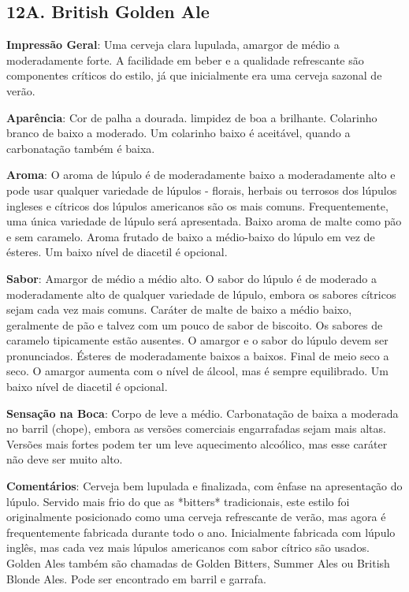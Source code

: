 \subsection*{12A. British Golden Ale}

\textbf{Impressão Geral}: Uma cerveja clara lupulada, amargor de médio a moderadamente forte. A facilidade em beber e a qualidade refrescante são componentes críticos do estilo, já que inicialmente era uma cerveja sazonal de verão.

\textbf{Aparência}: Cor de palha a dourada. limpidez de boa a brilhante. Colarinho branco de baixo a moderado. Um colarinho baixo é aceitável, quando a carbonatação também é baixa.

\textbf{Aroma}: O aroma de lúpulo é de moderadamente baixo a moderadamente alto e pode usar qualquer variedade de lúpulos - florais, herbais ou terrosos dos lúpulos ingleses e cítricos dos lúpulos americanos são os mais comuns. Frequentemente, uma única variedade de lúpulo será apresentada. Baixo aroma de malte como pão e sem caramelo. Aroma frutado de baixo a médio-baixo do lúpulo em vez de ésteres. Um baixo nível de diacetil é opcional.

\textbf{Sabor}: Amargor de médio a médio alto. O sabor do lúpulo é de moderado a moderadamente alto de qualquer variedade de lúpulo, embora os sabores cítricos sejam cada vez mais comuns. Caráter de malte de baixo a médio baixo, geralmente de pão e talvez com um pouco de sabor de biscoito. Os sabores de caramelo tipicamente estão ausentes. O amargor e o sabor do lúpulo devem ser pronunciados. Ésteres de moderadamente baixos a baixos. Final de meio seco a seco. O amargor aumenta com o nível de álcool, mas é sempre equilibrado. Um baixo nível de diacetil é opcional.

\textbf{Sensação na Boca}: Corpo de leve a médio. Carbonatação de baixa a moderada no barril (chope), embora as versões comerciais engarrafadas sejam mais altas. Versões mais fortes podem ter um leve aquecimento alcoólico, mas esse caráter não deve ser muito alto.

\textbf{Comentários}: Cerveja bem lupulada e finalizada, com ênfase na apresentação do lúpulo. Servido mais frio do que as *bitters* tradicionais, este estilo foi originalmente posicionado como uma cerveja refrescante de verão, mas agora é frequentemente fabricada durante todo o ano. Inicialmente fabricada com lúpulo inglês, mas cada vez mais lúpulos americanos com sabor cítrico são usados. Golden Ales também são chamadas de Golden Bitters, Summer Ales ou British Blonde Ales. Pode ser encontrado em barril e garrafa.

